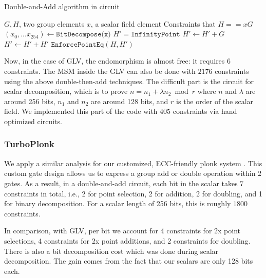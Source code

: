 \documentclass[smallextended]{svjour3}
\begin{document}
\begin{algorithm}
  \caption{Double-and-Add algorithm in circuit}\label{alg:double-and-add}
  \begin{algorithmic}
  \Require $G, H$, two group elements
  \Require $x$, a scalar field element
  \Ensure Constraints that $H == xG$
  \State $(x_0,...x_{254})\gets \texttt{BitDecompose(x)}$ 
  \State $H' = \texttt{InfinityPoint}$
             
      \State  $H' \gets H' + G$   
    \EndIf
    \State $H' \gets H' + H'$      
  \EndFor
  \State $\texttt{EnforcePointEq}(H, H')$ 
  \end{algorithmic}
\end{algorithm}

Now, in the case of GLV,
the endomorphism is almost free: it requires 
6 constraints. The MSM inside the GLV can also be done 
with $2176$ constraints using the above double-then-add
techniques.
The difficult part is the circuit for scalar decomposition,
which is to prove $n = n_1 +\lambda n_2 \bmod r$ where
$n$ and $\lambda$ are around 256 bits,
$n_1$ and $n_2$ are around 128 bits, and
$r$
is the order of the scalar field.
We implemented this part of the code with $405$ constraints
via hand optimized circuits.

\subsubsection{TurboPlonk}
We apply a similar analysis for our customized, ECC-friendly 
plonk system \cite{cryptoeprint:2022/802}. 
This custom gate design allows us to express a group add or 
double operation within 2 gates. 
As a result,
in a double-and-add circuit, each bit in the scalar
takes 7 constraints in total, i.e., 2 for point selection, 2 
for addition, 2 for doubling, and 1 for binary decomposition.
For a scalar length of 256 bits, this is roughly $1800$ constraints.

In comparison, with GLV, per bit we account for 4 constraints for 2x point selections,
4 constraints for 2x point additions, and 2 constraints for doubling.
There is also a bit decomposition cost which was done during scalar
decomposition. The gain comes from the fact that our scalars are only
128 bits each.
\end{document}
